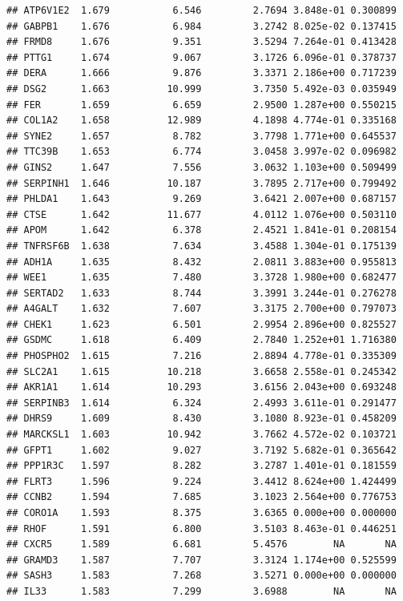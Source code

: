 \documentclass{article}\usepackage[]{graphicx}\usepackage[]{color}
\makeatletter
\newenvironment{kframe}{%
 \def\at@end@of@kframe{}%
 \ifinner\ifhmode%
  \def\at@end@of@kframe{\end{minipage}}%
  \begin{minipage}{\columnwidth}%
 \fi\fi%
 \def\FrameCommand##1{\hskip\@totalleftmargin \hskip-\fboxsep
 \colorbox{shadecolor}{##1}\hskip-\fboxsep
     \hskip-\linewidth \hskip-\@totalleftmargin \hskip\columnwidth}%
 \MakeFramed {\advance\hsize-\width
   \@totalleftmargin\z@ \linewidth\hsize
   \@setminipage}}%
 {\par\unskip\endMakeFramed%
 \at@end@of@kframe}
\newenvironment{knitrout}{}{} %
\makeatother
\begin{document}
\begin{knitrout}
\begin{kframe}
\begin{verbatim}
## ATP6V1E2  1.679           6.546         2.7694 3.848e-01 0.300899
## GABPB1    1.676           6.984         3.2742 8.025e-02 0.137415
## FRMD8     1.676           9.351         3.5294 7.264e-01 0.413428
## PTTG1     1.674           9.067         3.1726 6.096e-01 0.378737
## DERA      1.666           9.876         3.3371 2.186e+00 0.717239
## DSG2      1.663          10.999         3.7350 5.492e-03 0.035949
## FER       1.659           6.659         2.9500 1.287e+00 0.550215
## COL1A2    1.658          12.989         4.1898 4.774e-01 0.335168
## SYNE2     1.657           8.782         3.7798 1.771e+00 0.645537
## TTC39B    1.653           6.774         3.0458 3.997e-02 0.096982
## GINS2     1.647           7.556         3.0632 1.103e+00 0.509499
## SERPINH1  1.646          10.187         3.7895 2.717e+00 0.799492
## PHLDA1    1.643           9.269         3.6421 2.007e+00 0.687157
## CTSE      1.642          11.677         4.0112 1.076e+00 0.503110
## APOM      1.642           6.378         2.4521 1.841e-01 0.208154
## TNFRSF6B  1.638           7.634         3.4588 1.304e-01 0.175139
## ADH1A     1.635           8.432         2.0811 3.883e+00 0.955813
## WEE1      1.635           7.480         3.3728 1.980e+00 0.682477
## SERTAD2   1.633           8.744         3.3991 3.244e-01 0.276278
## A4GALT    1.632           7.607         3.3175 2.700e+00 0.797073
## CHEK1     1.623           6.501         2.9954 2.896e+00 0.825527
## GSDMC     1.618           6.409         2.7840 1.252e+01 1.716380
## PHOSPHO2  1.615           7.216         2.8894 4.778e-01 0.335309
## SLC2A1    1.615          10.218         3.6658 2.558e-01 0.245342
## AKR1A1    1.614          10.293         3.6156 2.043e+00 0.693248
## SERPINB3  1.614           6.324         2.4993 3.611e-01 0.291477
## DHRS9     1.609           8.430         3.1080 8.923e-01 0.458209
## MARCKSL1  1.603          10.942         3.7662 4.572e-02 0.103721
## GFPT1     1.602           9.027         3.7192 5.682e-01 0.365642
## PPP1R3C   1.597           8.282         3.2787 1.401e-01 0.181559
## FLRT3     1.596           9.224         3.4412 8.624e+00 1.424499
## CCNB2     1.594           7.685         3.1023 2.564e+00 0.776753
## CORO1A    1.593           8.375         3.6365 0.000e+00 0.000000
## RHOF      1.591           6.800         3.5103 8.463e-01 0.446251
## CXCR5     1.589           6.681         5.4576        NA       NA
## GRAMD3    1.587           7.707         3.3124 1.174e+00 0.525599
## SASH3     1.583           7.268         3.5271 0.000e+00 0.000000
## IL33      1.583           7.299         3.6988        NA       NA

\end{verbatim}
\end{kframe}
\end{knitrout}
\end{document}
